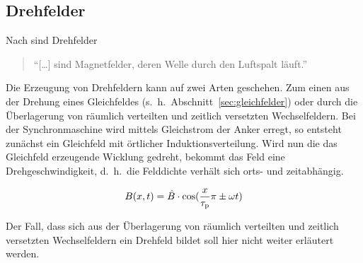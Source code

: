 \subsection{Drehfelder}\label{sec:drehfelder}

Nach \textcite{hofmann2013} sind Drehfelder

\begin{quote}
\enquote{[\ldots] sind Magnetfelder, deren Welle durch den Luftspalt läuft.}
\end{quote}

Die Erzeugung von Drehfeldern kann auf zwei Arten geschehen.
Zum einen aus der Drehung eines Gleichfeldes (s.~h.~Abschnitt~\ref{sec:gleichfelder}) oder durch die Überlagerung von räumlich verteilten und zeitlich versetzten Wechselfeldern.
Bei der Synchronmaschine wird mittels Gleichstrom der Anker erregt, so entsteht zunächst ein Gleichfeld mit örtlicher Induktionsverteilung.
Wird nun die das Gleichfeld erzeugende Wicklung gedreht, bekommt das Feld eine Drehgeschwindigkeit, d.\ h.\ die Felddichte verhält sich orts- und zeitabhängig.

\begin{align}
B(x,t) = \hat{B}\cdot\cos(\frac{x}{\tau_{\mathrm{p}}}\pi\pm\omega t)
\end{align}

Der Fall, dass sich aus der Überlagerung von räumlich verteilten und zeitlich versetzten Wechselfeldern ein Drehfeld bildet soll hier nicht weiter erläutert werden.




